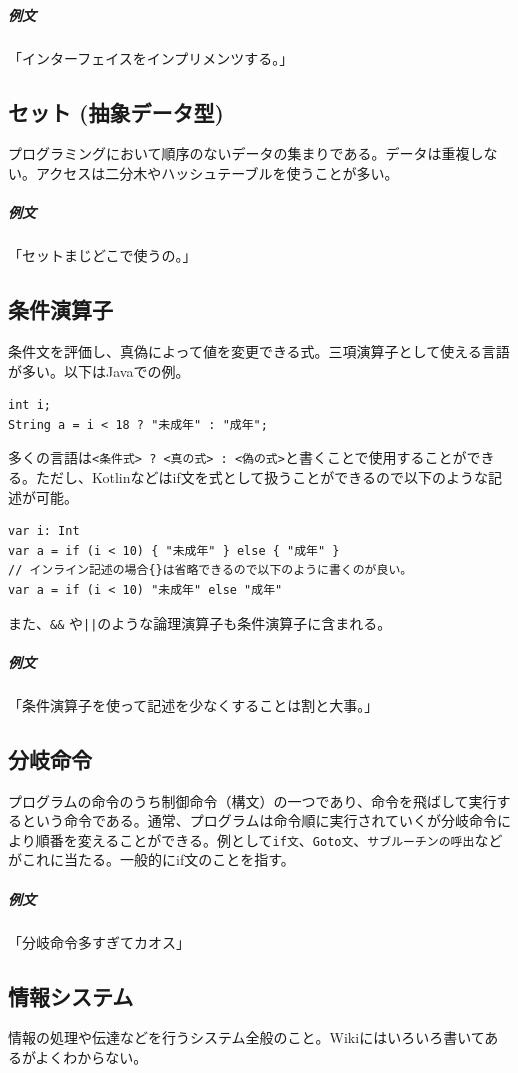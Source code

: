 \documentclass[a4paper]{ltjsreport}
\newcommand{\terlogy}[2][|]{\colorbox{terlogy}{\texttt{\lstinline#1#2#1}}}
\begin{document}
\subparagraph{例文}「インターフェイスをインプリメンツする。」

\subsection{セット (抽象データ型)}
プログラミングにおいて順序のないデータの集まりである。データは重複しない。アクセスは二分木やハッシュテーブルを使うことが多い。

\subparagraph{例文}「セットまじどこで使うの。」

\subsection{条件演算子}
条件文を評価し、真偽によって値を変更できる式。三項演算子として使える言語が多い。以下はJavaでの例。

\lstset{language=Java}
\begin{lstlisting}
int i;
String a = i < 18 ? "未成年" : "成年";
\end{lstlisting}

多くの言語は\terlogy{<条件式> ? <真の式> : <偽の式>}と書くことで使用することができる。ただし、Kotlinなどはif文を式として扱うことができるので以下のような記述が可能。

\lstset{language=Kotlin}
\begin{lstlisting}
var i: Int
var a = if (i < 10) { "未成年" } else { "成年" }
// インライン記述の場合{}は省略できるので以下のように書くのが良い。
var a = if (i < 10) "未成年" else "成年"
\end{lstlisting}

また、\terlogy{&&}  や\terlogy{||}のような論理演算子も条件演算子に含まれる。

\subparagraph{例文}「条件演算子を使って記述を少なくすることは割と大事。」

\subsection{分岐命令}
プログラムの命令のうち制御命令（構文）の一つであり、命令を飛ばして実行するという命令である。通常、プログラムは命令順に実行されていくが分岐命令により順番を変えることができる。例として\terlogy{if文}、\terlogy{Goto文}、\terlogy{サブルーチンの呼出}などがこれに当たる。一般的にif文のことを指す。

\subparagraph{例文}「分岐命令多すぎてカオス」

\subsection{情報システム}
情報の処理や伝達などを行うシステム全般のこと。Wikiにはいろいろ書いてあるがよくわからない。
\end{document}
